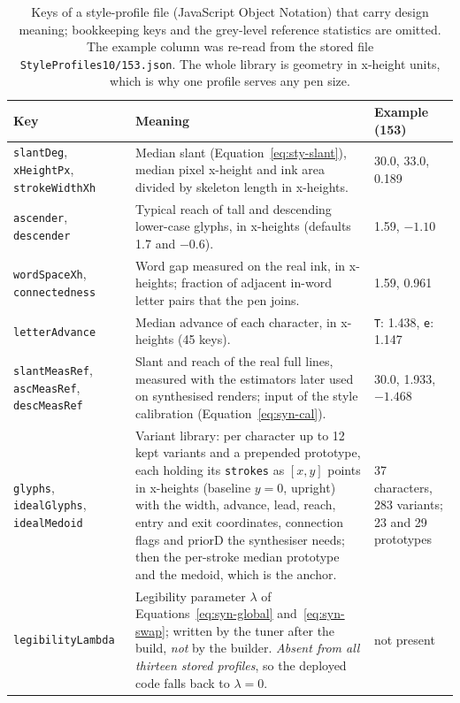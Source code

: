 \begin{table}[!htbp]
\centering
\fontsize{7.5}{9}\selectfont
\setlength{\tabcolsep}{3pt}
\renewcommand{\arraystretch}{1.05}
\begin{tabularx}{\linewidth}{|p{2.6cm}|X|p{2.1cm}|}
\hline
\textbf{Key} & \textbf{Meaning} & \textbf{Example (153)} \\
\hline
\texttt{slantDeg}, \texttt{xHeightPx}, \texttt{strokeWidthXh} & Median slant (Equation~\ref{eq:sty-slant}), median pixel x-height and ink area divided by skeleton length in x-heights. & 30.0, 33.0, 0.189 \\
\hline
\texttt{ascender}, \texttt{descender} & Typical reach of tall and descending lower-case glyphs, in x-heights (defaults 1.7 and $-0.6$). & 1.59, $-1.10$ \\
\hline
\texttt{wordSpaceXh}, \texttt{connectedness} & Word gap measured on the real ink, in x-heights; fraction of adjacent in-word letter pairs that the pen joins. & 1.59, 0.961 \\
\hline
\texttt{letterAdvance} & Median advance of each character, in x-heights (45 keys). & \texttt{T}: 1.438, \texttt{e}: 1.147 \\
\hline
\texttt{slantMeasRef}, \texttt{ascMeasRef}, \texttt{descMeasRef} & Slant and reach of the real full lines, measured with the estimators later used on synthesised renders; input of the style calibration (Equation~\ref{eq:syn-cal}). & 30.0, 1.933, $-1.468$ \\
\hline
\texttt{glyphs}, \texttt{idealGlyphs}, \texttt{idealMedoid} & Variant library: per character up to 12 kept variants and a prepended prototype, each holding its \texttt{strokes} as $[x,y]$ points in x-heights (baseline $y=0$, upright) with the width, advance, lead, reach, entry and exit coordinates, connection flags and $\mathrm{priorD}$ the synthesiser needs; then the per-stroke median prototype and the medoid, which is the anchor. & 37 characters, 283 variants; 23 and 29 prototypes \\
\hline
\texttt{legibilityLambda} & Legibility parameter $\lambda$ of Equations~\ref{eq:syn-global} and~\ref{eq:syn-swap}; written by the tuner after the build, \emph{not} by the builder. \emph{Absent from all thirteen stored profiles}, so the deployed code falls back to $\lambda=0$. & not present \\
\hline
\end{tabularx}
\caption{Keys of a style-profile file (JavaScript Object Notation) that carry design meaning; bookkeeping keys and the grey-level reference statistics are omitted. The example column was re-read from the stored file \texttt{StyleProfiles10/153.json}. The whole library is geometry in x-height units, which is why one profile serves any pen size.}
\label{tab:sty-schema}
\end{table}

